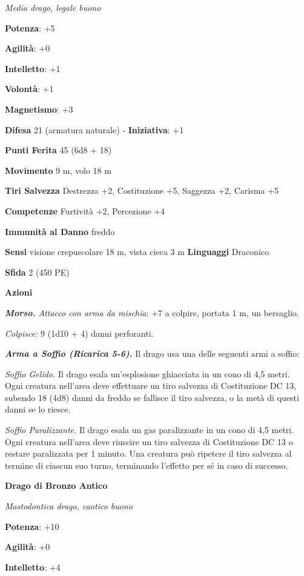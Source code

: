 \begin{multicols}{2}
\emph{Media drago, legale buono}

\textbf{Potenza}: +5

\textbf{Agilità}: +0

\textbf{Intelletto}: +1

\textbf{Volontà}: +1

\textbf{Magnetismo}: +3

\textbf{Difesa} 21 (armatura naturale) - \textbf{Iniziativa}: +1

\textbf{Punti Ferita} 45 (6d8 + 18)

\textbf{Movimento} 9 m, volo 18 m

\textbf{Tiri Salvezza} Destrezza +2, Costituzione +5, Saggezza +2,
Carisma +5

\textbf{Competenze} Furtività +2, Percezione +4

\textbf{Immunità al Danno} freddo

\textbf{Sensi} visione crepuscolare 18 m, vista cieca 3 m
\textbf{Linguaggi} Draconico

\textbf{Sfida} 2 (450 PE)\smallskip

\smallskip\textbf{Azioni}

\emph{\textbf{Morso.} Attacco con arma da mischia}: +7 a colpire,
portata 1 m, un bersaglio.

\emph{Colpisce:} 9 (1d10 + 4) danni perforanti.

\emph{\textbf{Arma a Soffio (Ricarica 5-6).}} Il drago usa una delle
seguenti armi a soffio:

\emph{Soffio Gelido.} Il drago esala un'esplosione ghiacciata in un cono
di 4,5 metri. Ogni creatura nell'area deve effettuare un tiro salvezza
di Costituzione DC 13, subendo 18 (4d8) danni da freddo se fallisce il
tiro salvezza, o la metà di questi danni se lo riesce.

\emph{Soffio Paralizzante.} Il drago esala un gas paralizzante in un
cono di 4,5 metri. Ogni creatura nell'area deve riuscire un tiro
salvezza di Costituzione DC 13 o restare paralizzata per 1 minuto. Una
creatura può ripetere il tiro salvezza al termine di ciascun suo turno,
terminando l'effetto per sé in caso di successo.



\textbf{Drago di Bronzo Antico}

\emph{Mastodontica drago, caotico buono}

\textbf{Potenza}: +10

\textbf{Agilità}: +0

\textbf{Intelletto}: +4


\end{multicols}
